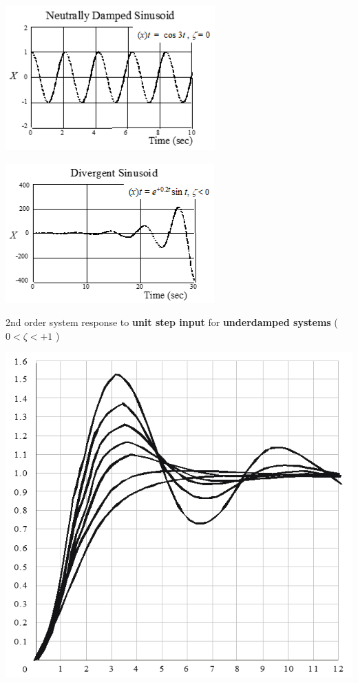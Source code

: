 \documentclass[
]{book}
\begin{document}
\includegraphics{media/08/image51.png}

\includegraphics{media/08/image52.png}

2nd order system response to \textbf{unit step input} for \textbf{underdamped systems} ( \(0 < \zeta < +1\) )

\includegraphics{media/08/image53.png}
\end{document}
